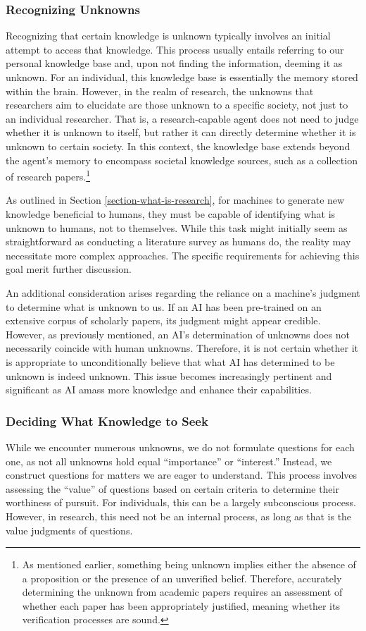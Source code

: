 \documentclass{article}
\begin{document}
\subsubsection{Recognizing Unknowns}
Recognizing that certain knowledge is unknown typically involves an initial attempt to access that knowledge. This process usually entails referring to our personal knowledge base and, upon not finding the information, deeming it as unknown. For an individual, this knowledge base is essentially the memory stored within the brain. However, in the realm of research, the unknowns that researchers aim to elucidate are those unknown to a specific society, not just to an individual researcher. That is, a research-capable agent does not need to judge whether it is unknown to itself, but rather it can directly determine whether it is unknown to certain society. In this context, the knowledge base extends beyond the agent's memory to encompass societal knowledge sources, such as a collection of research papers.\footnote{
As mentioned earlier, something being unknown implies either the absence of a proposition or the presence of an unverified belief. Therefore, accurately determining the unknown from academic papers requires an assessment of whether each paper has been appropriately justified, meaning whether its verification processes are sound.
}

As outlined in Section \ref{section-what-is-research}, for machines to generate new knowledge beneficial to humans, they must be capable of identifying what is unknown to humans, not to themselves. While this task might initially seem as straightforward as conducting a literature survey as humans do, the reality may necessitate more complex approaches. The specific requirements for achieving this goal merit further discussion.

An additional consideration arises regarding the reliance on a machine's judgment to determine what is unknown to us. If an AI has been pre-trained on an extensive corpus of scholarly papers, its judgment might appear credible. However, as previously mentioned, an AI's determination of unknowns does not necessarily coincide with human unknowns. Therefore, it is not certain whether it is appropriate to unconditionally believe that what AI has determined to be unknown is indeed unknown. This issue becomes increasingly pertinent and significant as AI amass more knowledge and enhance their capabilities.

\subsubsection{Deciding What Knowledge to Seek}
\label{section-deciding-what-knowledge-to-seek}
While we encounter numerous unknowns, we do not formulate questions for each one, as not all unknowns hold equal ``importance'' or ``interest.'' Instead, we construct questions for matters we are eager to understand. This process involves assessing the ``value'' of questions based on certain criteria to determine their worthiness of pursuit. For individuals, this can be a largely subconscious process. However, in research, this need not be an internal process, as long as that is the value judgments of questions.
\end{document}
